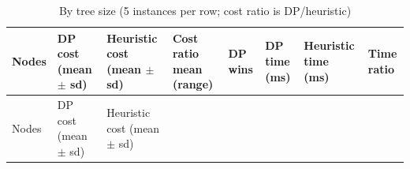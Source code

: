 \documentclass[
  11pt,
]{article}
\begin{document}
\begin{longtable}[]{@{}
  >{\raggedright\arraybackslash}p{}
  >{\raggedright\arraybackslash}p{}
  >{\raggedright\arraybackslash}p{}
  >{\raggedright\arraybackslash}p{}
  >{\raggedright\arraybackslash}p{}
  >{\raggedright\arraybackslash}p{}
  >{\raggedright\arraybackslash}p{}
  >{\raggedright\arraybackslash}p{}@{}}
\caption{By tree size (5 instances per row; cost ratio is
DP/heuristic)}\tabularnewline
\toprule\noalign{}
\begin{minipage}[b]{\linewidth}\raggedright
Nodes
\end{minipage} & \begin{minipage}[b]{\linewidth}\raggedright
DP cost (mean \(\pm\) sd)
\end{minipage} & \begin{minipage}[b]{\linewidth}\raggedright
Heuristic cost (mean \(\pm\) sd)
\end{minipage} & \begin{minipage}[b]{\linewidth}\raggedright
Cost ratio mean (range)
\end{minipage} & \begin{minipage}[b]{\linewidth}\raggedright
DP wins
\end{minipage} & \begin{minipage}[b]{\linewidth}\raggedright
DP time (ms)
\end{minipage} & \begin{minipage}[b]{\linewidth}\raggedright
Heuristic time (ms)
\end{minipage} & \begin{minipage}[b]{\linewidth}\raggedright
Time ratio
\end{minipage} \\
\midrule\noalign{}
\endfirsthead
\toprule\noalign{}
\begin{minipage}[b]{\linewidth}\raggedright
Nodes
\end{minipage} & \begin{minipage}[b]{\linewidth}\raggedright
DP cost (mean \(\pm\) sd)
\end{minipage} & \begin{minipage}[b]{\linewidth}\raggedright
Heuristic cost (mean \(\pm\) sd)

\end{minipage}
\end{longtable}
\end{document}
